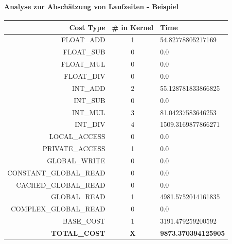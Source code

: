 \documentclass{beamer}
\begin{document}
\begin{frame}
	\frametitle{}
	\framesubtitle{Analyse zur Abschätzung von Laufzeiten - Beispiel}
	\begin{footnotesize}
	\begin{center}
                \begin{tabular}{r|c|l}
                        \textbf{Cost Type} & \textbf{\# in Kernel} & \textbf{Time} \\
                        \hline
                        FLOAT\_ADD & 1 & 54.82778805217169 \\
                        FLOAT\_SUB & 0 & 0.0 \\
                        FLOAT\_MUL & 0 & 0.0 \\
                        FLOAT\_DIV & 0 & 0.0 \\
                        INT\_ADD & 2 & 55.128781833866825 \\
                        INT\_SUB & 0 & 0.0 \\
                        INT\_MUL & 3 & 81.04237583646253 \\
                        INT\_DIV & 4 & 1509.3169877866271 \\
                        LOCAL\_ACCESS & 0 & 0.0 \\
                        PRIVATE\_ACCESS & 1 & 0.0 \\
                        GLOBAL\_WRITE & 0 & 0.0 \\
                        CONSTANT\_GLOBAL\_READ & 0 & 0.0 \\
                        CACHED\_GLOBAL\_READ & 0 & 0.0 \\
                        GLOBAL\_READ & 1 & 4981.5752014161835 \\
                        COMPLEX\_GLOBAL\_READ & 0 & 0.0  \\
                        BASE\_COST & 1 & 3191.479259200592 \\
                        \hline
                        \textbf{TOTAL\_COST} & \textbf{X} & \textbf{9873.370394125905}
                \end{tabular}
        \end{center}
        \end{footnotesize}
\end{frame}
\end{document}
